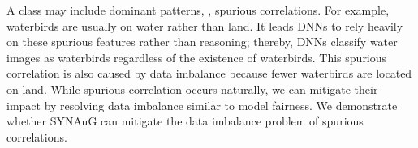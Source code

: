 
A class may include dominant patterns, \ie, spurious correlations.
For example, waterbirds are usually on water rather than land.
It leads DNNs to rely heavily on these spurious features rather than reasoning; thereby, DNNs classify water images as waterbirds regardless of the existence of waterbirds.
This spurious correlation is also caused by data imbalance because fewer waterbirds are located on land.
While spurious correlation occurs naturally, we can mitigate their impact by resolving data imbalance
similar to model fairness.
We demonstrate whether SYNAuG can mitigate the data imbalance problem of spurious correlations.



